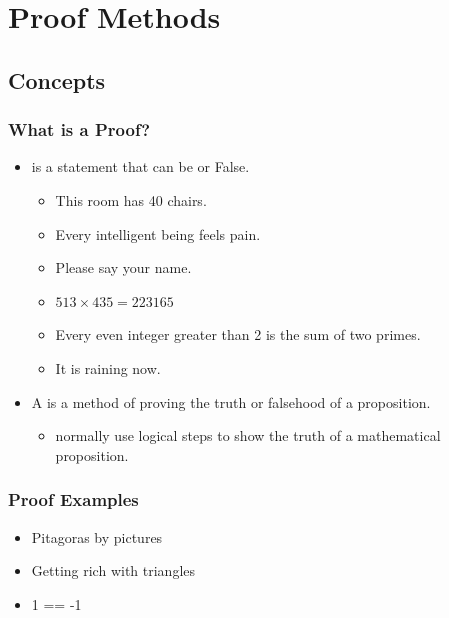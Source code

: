 \section{Proof Methods}



\subsection{Concepts}

\begin{frame}
  \frametitle{What is a Proof?}

  \begin{itemize}
  \item {} is a statement that can be
     or \alert{False}.
    \begin{itemize}
    \item This room has 40 chairs.
    \item Every intelligent being feels pain.
    \item Please say your name.
    \item $513 \times 435 = 223165$
    \item Every even integer greater than 2 is the sum of two primes.
    \item It is raining now.
    \end{itemize}

    \bigskip

  \item A  is a method of proving the truth or falsehood of a proposition.
    \begin{itemize}
    \item {} normally use logical steps
      to show the truth of a mathematical proposition.
    \end{itemize}
  \end{itemize}

\end{frame}

\begin{frame}
  \frametitle{Proof Examples}
  \begin{itemize}
  \item Pitagoras by pictures
  \item Getting rich with triangles
  \item 1 == -1
  \end{itemize}
\end{frame}

